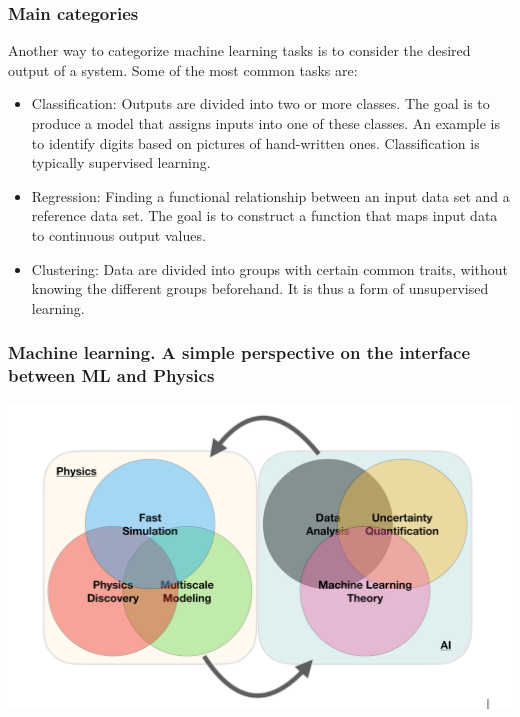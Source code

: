 \documentclass{beamer}
\begin{document}
\begin{frame}
\frametitle{Main categories}

\begin{block}{}
Another way to categorize machine learning tasks is to consider the desired output of a system.
Some of the most common tasks are:

\begin{itemize}
  \item Classification: Outputs are divided into two or more classes. The goal is to   produce a model that assigns inputs into one of these classes. An example is to identify  digits based on pictures of hand-written ones. Classification is typically supervised learning.

  \item Regression: Finding a functional relationship between an input data set and a reference data set.   The goal is to construct a function that maps input data to continuous output values.

  \item Clustering: Data are divided into groups with certain common traits, without knowing the different groups beforehand.  It is thus a form of unsupervised learning.
\end{itemize}

\noindent
\end{block}
\end{frame}

\begin{frame}
\frametitle{Machine learning. A simple perspective on the interface between ML and Physics}

\vspace{6mm}

\centerline{\includegraphics[width=1.0\linewidth]{figures/mlimage.png}}

\vspace{6mm}
\end{frame}
\end{document}

